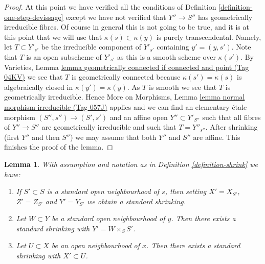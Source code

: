 \documentclass{amsart}
\theoremstyle{plain}
\newtheorem{lemma}[subsection]{Lemma}
\theoremstyle{definition}
\theoremstyle{remark}
\numberwithin{equation}{subsection}
\begin{document}
\begin{proof}
\medskip\noindent
At this point we have verified all the conditions of
Definition \ref{definition-one-step-devissage}
except we have not verified that $Y'' \to S''$ has geometrically
irreducible fibres. Of course in general this is not going to be
true, and it is at this point that we will use that
$\kappa(s) \subset \kappa(y)$ is purely transcendental. Namely,
let $T \subset Y'_{s'}$ be the irreducible component of
$Y'_{s'}$ containing $y' = (y, s')$. Note that $T$ is an open subscheme
of $Y'_{s'}$ as this is a smooth scheme over $\kappa(s')$. By
Varieties,
Lemma \href{https://stacks.math.columbia.edu/tag/04KV}{lemma geometrically connected if connected and point (Tag 04KV)}
we see that $T$ is geometrically connected because $\kappa(s') = \kappa(s)$
is algebraically closed in $\kappa(y') = \kappa(y)$.
As $T$ is smooth we see that $T$ is geometrically irreducible. Hence
More on Morphisms,
Lemma \href{https://stacks.math.columbia.edu/tag/057J}{lemma normal morphism irreducible (Tag 057J)}
applies and we can find an elementary \'etale morphism
$(S'', s'') \to (S', s')$ and an affine open $Y'' \subset Y'_{S''}$
such that all fibres of $Y'' \to S''$ are geometrically irreducible
and such that $T = Y''_{s''}$. After shrinking (first $Y''$ and then $S''$)
we may assume that both $Y''$ and $S''$ are affine.
This finishes the proof of the lemma.
\end{proof}


\begin{lemma}
\label{lemma-shrink}
With assumption and notation as in
Definition \ref{definition-shrink}
we have:
\begin{enumerate}
\item
\label{item-shrink-base}
If $S' \subset S$ is a standard open neighbourhood of $s$, then
setting $X' = X_{S'}$, $Z' = Z_{S'}$ and $Y' = Y_{S'}$ we obtain a
standard shrinking.
\item
\label{item-shrink-on-Y}
Let $W \subset Y$ be a standard open neighbourhood of $y$.
Then there exists a standard shrinking with $Y' = W \times_S S'$.
\item
\label{item-shrink-on-X}
Let $U \subset X$ be an open neighbourhood of $x$.
Then there exists a standard shrinking with $X' \subset U$.
\end{enumerate}
\end{lemma}
\end{document}
